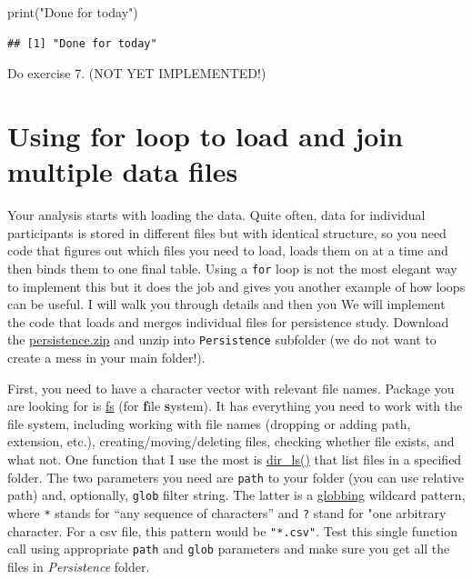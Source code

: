 \documentclass[
]{book}
\newenvironment{Shaded}{\begin{snugshade}}{\end{snugshade}}
\newcommand{\FunctionTok}[1]{\textcolor[rgb]{0.00,0.00,0.00}{#1}}
\newcommand{\NormalTok}[1]{#1}
\newcommand{\StringTok}[1]{\textcolor[rgb]{0.31,0.60,0.02}{#1}}
\begin{document}
\begin{Shaded}
\begin{Highlighting}[]
\FunctionTok{print}\NormalTok{(}\StringTok{"Done for today"}\NormalTok{)}
\end{Highlighting}
\end{Shaded}

\begin{verbatim}
## [1] "Done for today"
\end{verbatim}

Do exercise 7. (NOT YET IMPLEMENTED!)

\hypertarget{using-for-loop-to-load-and-join-multiple-data-files}{%
\section{Using for loop to load and join multiple data files}\label{using-for-loop-to-load-and-join-multiple-data-files}}

Your analysis starts with loading the data. Quite often, data for individual participants is stored in different files but with identical structure, so you need code that figures out which files you need to load, loads them on at a time and then binds them to one final table. Using a \texttt{for} loop is not the most elegant way to implement this but it does the job and gives you another example of how loops can be useful. I will walk you through details and then you We will implement the code that loads and merges individual files for persistence study. Download the \href{data/persistence.zip}{persistence.zip} and unzip into \texttt{Persistence} subfolder (we do not want to create a mess in your main folder!).

First, you need to have a character vector with relevant file names. Package you are looking for is \href{https://github.com/r-lib/fs}{fs} (for \textbf{f}ile \textbf{s}ystem). It has everything you need to work with the file system, including working with file names (dropping or adding path, extension, etc.), creating/moving/deleting files, checking whether file exists, and what not. One function that I use the most is \href{https://www.rdocumentation.org/packages/fs/versions/1.5.0/topics/dir_ls}{dir\_ls()} that list files in a specified folder. The two parameters you need are \texttt{path} to your folder (you can use relative path) and, optionally, \texttt{glob} filter string. The latter is a \href{https://en.wikipedia.org/wiki/Glob_(programming)}{globbing} wildcard pattern, where \texttt{*} stands for ``any sequence of characters'' and \texttt{?} stand for "one arbitrary character. For a csv file, this pattern would be \texttt{"*.csv"}. Test this single function call using appropriate \texttt{path} and \texttt{glob} parameters and make sure you get all the files in \emph{Persistence} folder.
\end{document}
